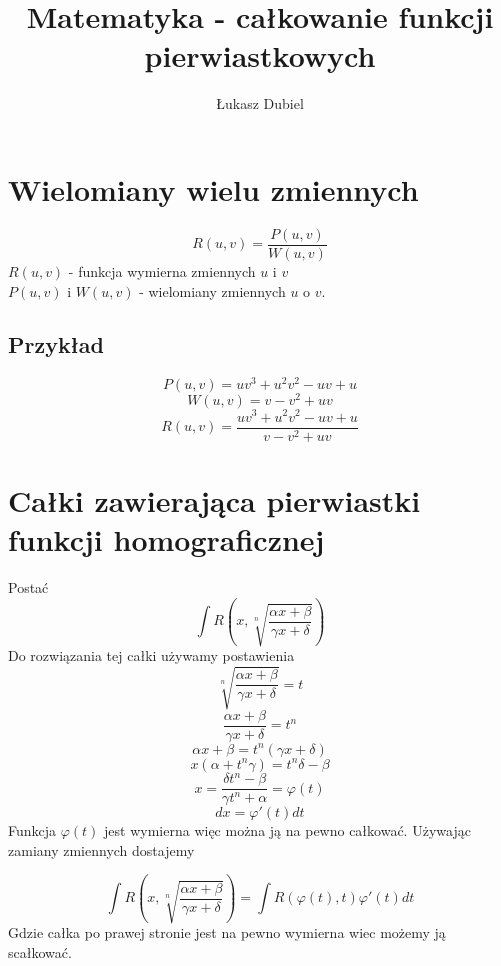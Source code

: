 \documentclass[11pt]{article}
\author{Łukasz Dubiel}
\title{Matematyka - całkowanie funkcji pierwiastkowych }
\begin{document}
\maketitle
\section{Wielomiany wielu zmiennych}
$$ R(u,v) = \frac{P(u,v)}{W(u,v)} $$
$R(u,v)$ - funkcja wymierna zmiennych $u$ i $v$ \\
$P(u,v)$ i $W(u,v)$ - wielomiany zmiennych $u$ o $v$.

\subsection{Przykład}
$$ P(u,v) = uv^3 + u^2v^2 - uv + u$$
$$ W(u,v) = v - v^2 + uv $$
$$ R(u,v) = \frac{uv^3 + u^2v^2 - uv + u}{v - v^2 + uv} $$

\section{Całki zawierająca pierwiastki funkcji homograficznej}
Postać
$$ \int R\left(x,\sqrt[n]{\frac{\alpha x + \beta}{\gamma x + \delta}}\right) $$
Do rozwiązania tej całki używamy postawienia
$$ \sqrt[n]{\frac{\alpha x + \beta}{\gamma x + \delta}} = t $$
$$ \frac{\alpha x + \beta}{\gamma x + \delta} = t^n $$
$$ \alpha x + \beta = t^n(\gamma x + \delta )$$
$$ x(\alpha +t^n \gamma) = t^n \delta - \beta $$
$$ x = \frac{\delta t^n - \beta}{\gamma t^n  + \alpha} = \varphi(t)$$
$$ dx = \varphi'(t)dt$$
Funkcja $\varphi(t)$ jest wymierna więc można ją na pewno całkować. Używając zamiany zmiennych dostajemy

$$ \int R\left(x,\sqrt[n]{\frac{\alpha x + \beta}{\gamma x + \delta}}\right) = \int R \left( \varphi(t),t\right)\varphi'(t)dt $$
Gdzie całka po prawej stronie jest na pewno wymierna wiec możemy ją scałkować.
\end{document}

